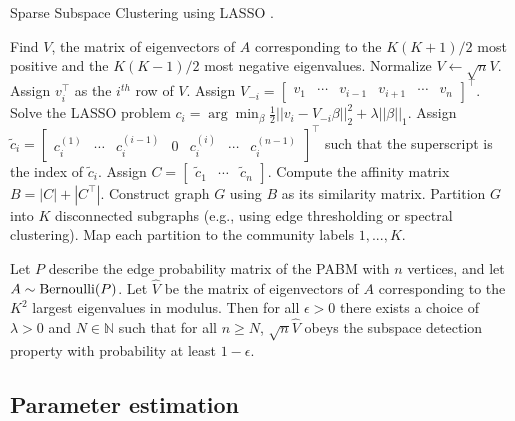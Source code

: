 \documentclass[12pt]{article}
\begin{document}
\begin{algorithm}[t]
  \DontPrintSemicolon
  \SetAlgoLined
  \caption{Sparse Subspace Clustering using LASSO \cite{jmlr-v28-wang13}.}
    Find $V$, the matrix of eigenvectors of $A$
    corresponding to the $K (K + 1) / 2$ most positive
    and the $K (K - 1) / 2$ most negative eigenvalues.\;
    Normalize $V \leftarrow \sqrt{n} V$.\;
     {
      Assign $v_i^\top$ as the $i^{th}$ row of $V$.
      Assign $V_{-i} = \begin{bmatrix}
      v_1 & \cdots & v_{i-1} & v_{i+1} & \cdots & v_n \end{bmatrix}^\top$.\;
      Solve the LASSO problem
      $c_i = \arg\min_{\beta}
      \frac{1}{2} ||v_i - V_{-i} \beta||_2^2 + \lambda ||\beta||_1$.\;
      Assign $\tilde{c}_i = \begin{bmatrix}
      c_i^{(1)} & \cdots & c_i^{(i-1)} & 0 & c_i^{(i)} & \cdots & c_i^{(n-1)}
      \end{bmatrix}^\top$ such that the superscript is the index of
      $\tilde{c}_i$.\;
    }
    Assign
    $C = \begin{bmatrix} \tilde{c}_1 & \cdots & \tilde{c}_n \end{bmatrix}$.\;
    Compute the affinity matrix $B = |C| + |C^\top|$.\;
    Construct graph $G$ using $B$ as its similarity matrix.\;
    Partition $G$ into $K$ disconnected subgraphs (e.g., using edge
    thresholding or spectral clustering).\;
    Map each partition to the community labels $1, ..., K$.
\end{algorithm}

\begin{theorem}
\label{theorem5}
Let $P$ describe the edge probability matrix of the PABM with
$n$ vertices, and let $A \sim \mathrm{Bernoulli}(P)$.  Let $\hat{V}$ be the
matrix of eigenvectors of $A$ corresponding to the $K^2$ largest
eigenvalues in modulus. Then for all $\epsilon > 0$ 
there exists a choice of $\lambda > 0$ and $N \in \mathbb{N}$ such
that for all $n \geq N$, $\sqrt{n} \hat{V}$ obeys the subspace detection property with
probability at least $1 - \epsilon$.  
\end{theorem}

\hypertarget{parameter-estimation}{%
\subsection{Parameter estimation}\label{parameter-estimation}}
\end{document}
